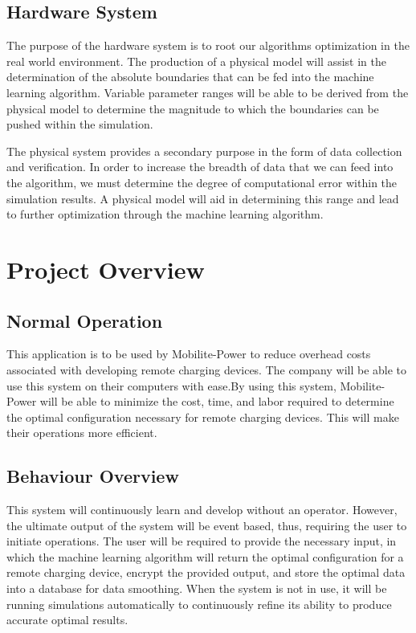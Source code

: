 \documentclass[12pt, titlepage]{article}
\begin{document}
\subsection{Hardware System}
The purpose of the hardware system is to root our algorithms optimization in the real world environment. The production of a physical model will assist in the determination of the absolute boundaries that can be fed into the machine learning algorithm. Variable parameter ranges will be able to be derived from the physical model to determine the magnitude to which the boundaries can be pushed within the simulation. 
\par
The physical system provides a secondary purpose in the form of data collection and verification. In order to increase the breadth of data that we can feed into the algorithm, we must determine the degree of computational error within the simulation results. A physical model will aid in determining this range and lead to further optimization through the machine learning algorithm. 

\section{Project Overview}
\subsection{Normal Operation}
This application is to be used by Mobilite-Power to reduce overhead costs associated with developing remote charging devices. The company will be able to use this system on their computers with ease.By using this system, Mobilite-Power will be able to minimize the cost, time, and labor required to determine the optimal configuration necessary for remote charging devices. This will make their operations more efficient.

\subsection{Behaviour Overview}
This system will continuously learn and develop without an operator. However, the ultimate output of the system will be event based, thus, requiring the user to initiate operations. The user will be required to provide the necessary input, in which the machine learning algorithm will return the optimal configuration for a remote charging device, encrypt the provided output, and store the optimal data into a database for data smoothing. When the system is not in use, it will be running simulations automatically to continuously refine its ability to produce accurate optimal results.
\end{document}
